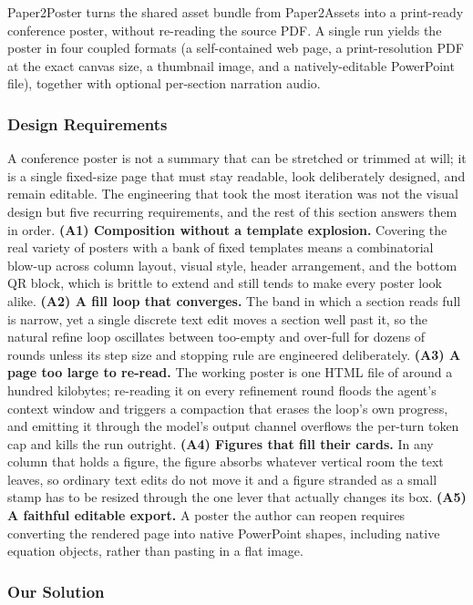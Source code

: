 \documentclass{article}
\begin{document}
Paper2Poster turns the shared asset bundle from Paper2Assets into a print-ready conference poster, without re-reading the source PDF. A single run yields the poster in four coupled formats (a self-contained web page, a print-resolution PDF at the exact canvas size, a thumbnail image, and a natively-editable PowerPoint file), together with optional per-section narration audio.

\subsubsection{Design Requirements}

A conference poster is not a summary that can be stretched or trimmed at will; it is a single fixed-size page that must stay readable, look deliberately designed, and remain editable. The engineering that took the most iteration was not the visual design but five recurring requirements, and the rest of this section answers them in order. \textbf{(A1) Composition without a template explosion.} Covering the real variety of posters with a bank of fixed templates means a combinatorial blow-up across column layout, visual style, header arrangement, and the bottom QR block, which is brittle to extend and still tends to make every poster look alike. \textbf{(A2) A fill loop that converges.} The band in which a section reads full is narrow, yet a single discrete text edit moves a section well past it, so the natural refine loop oscillates between too-empty and over-full for dozens of rounds unless its step size and stopping rule are engineered deliberately. \textbf{(A3) A page too large to re-read.} The working poster is one HTML file of around a hundred kilobytes; re-reading it on every refinement round floods the agent's context window and triggers a compaction that erases the loop's own progress, and emitting it through the model's output channel overflows the per-turn token cap and kills the run outright. \textbf{(A4) Figures that fill their cards.} In any column that holds a figure, the figure absorbs whatever vertical room the text leaves, so ordinary text edits do not move it and a figure stranded as a small stamp has to be resized through the one lever that actually changes its box. \textbf{(A5) A faithful editable export.} A poster the author can reopen requires converting the rendered page into native PowerPoint shapes, including native equation objects, rather than pasting in a flat image.

\subsubsection{Our Solution}
\end{document}

